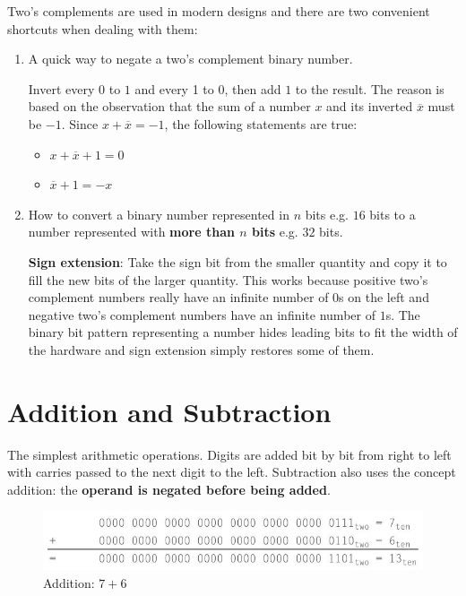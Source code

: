 \documentclass[10pt,a4paper]{article}
\begin{document}
\pagebreak

Two's complements are used in modern designs and there are two convenient shortcuts when dealing
with them:
\begin{enumerate}
    \item A quick way to negate a two’s complement binary number. 
    
    Invert every $0$ to $1$ and every 1 to 0, then add $1$ to the result. The reason is based on the
    observation that the sum of a number $x$ and its inverted $\overline{x}$ must be $-1$. Since
    $x+\overline{x}=-1$, the following statements are true:
    \begin{itemize}
        \item $x+\overline{x}+1=0$
        \item $\overline{x}+1=-x$
    \end{itemize}
    \item How to convert a binary number represented in $n$ bits e.g. $16$ bits to a number
    represented with \textbf{more than $n$ bits} e.g. $32$ bits. 

    \textbf{Sign extension}: Take the sign bit from the smaller quantity and copy it to fill the new
    bits of the larger quantity. This works because positive two’s complement numbers really have an
    infinite number of $0$s on the left and negative two’s complement numbers have an infinite
    number of $1$s. The binary bit pattern representing a number hides leading bits to fit the
    width of the hardware and sign extension simply restores some of them.
\end{enumerate}

\section{Addition and Subtraction}

The simplest arithmetic operations. Digits are added bit by bit from right to left with carries
passed to the next digit to the left. Subtraction also uses the concept addition: the \textbf{operand is negated before being added}.

\begin{figure} [h!]
    \centering
    \includegraphics[scale=0.7]{Add.JPG}
    \caption{Addition: $7+6$}
\end{figure}
\end{document}
